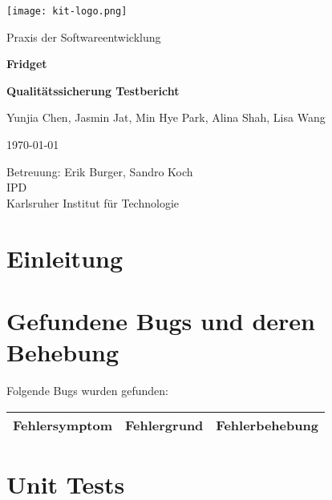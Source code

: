 \documentclass[a4paper]{scrreprt}
\begin{document}
	
	\begin{flushright}
		\texttt{[image: kit-logo.png]}\\[0.5cm]
	\end{flushright}
	\vspace*{2cm}
	
	\begin{center}
		\large Praxis der Softwareentwicklung
		\vspace*{1.5cm}
		
		\textbf{\huge Fridget}
		\vspace*{1cm}
		
		\textbf{\Large Qualitätssicherung Testbericht}
		\vspace*{2cm}
		
		Yunjia Chen, Jasmin Jat, Min Hye Park, Alina Shah, Lisa Wang
		\vspace*{1cm}
		
		\today
		\vspace*{2.5cm}
		
		Betreuung: Erik Burger, Sandro Koch\\[0.5cm]
		IPD\\[0.5cm]
		
		Karlsruher Institut für Technologie
		
	\end{center}

	\thispagestyle{empty}
	
	\tableofcontents
	
	\chapter{Einleitung}
	
	
	\chapter{Gefundene Bugs und deren Behebung}
	Folgende Bugs wurden gefunden:
	\begin{flushleft}
		\begin{longtable}{|p{}|p{}|p{}|}
		\hline
		\textbf{Fehlersymptom} & \textbf{Fehlergrund} & \textbf{Fehlerbehebung} \\
		\hline
		\end{longtable}
	\end{flushleft}	
	
	\chapter{Unit Tests}
\end{document}
